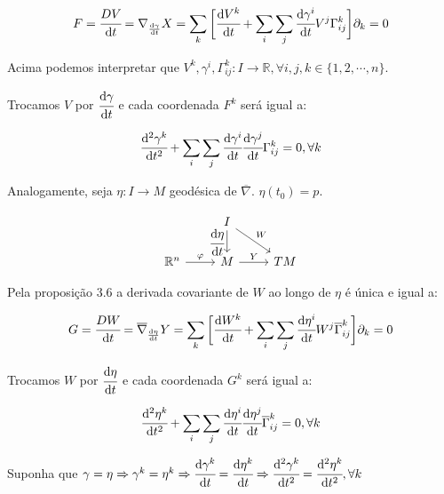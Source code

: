 \documentclass[10pt,a4paper]{article}
\begin{document}
		\begin{align*}
		  F = \cfrac{DV}{\mathrm{d} t} = \nabla_{\frac{\mathrm{d} \gamma}{\mathrm{d} t}} X = \sum_k \bigg[ \cfrac{\mathrm{d} V^k}{\mathrm{d} t} + \sum_i \sum_j \cfrac{\mathrm{d} \gamma^i}{\mathrm{d} t} V^j \Gamma_{ij}^k \bigg] \partial_k = 0
		\end{align*}

		Acima podemos interpretar que $V^k, \gamma^i, \Gamma_{ij}^k : I \rightarrow \mathbb{R}, \forall i,j,k \in \{ 1, 2, \cdots, n \}$.

		Trocamos $V$ por $\cfrac{\mathrm{d} \gamma}{\mathrm{d} t}$ e cada coordenada $F^k$ ser\'a igual a:

		\begin{align*}
		  \cfrac{\mathrm{d}^2 \gamma^k}{\mathrm{d} t^2} + \sum_i \sum_j \cfrac{\mathrm{d} \gamma^i}{\mathrm{d} t} \cfrac{\mathrm{d} \gamma^j}{\mathrm{d} t} \Gamma_{ij}^k = 0, \forall k
		\end{align*}

		Analogamente, seja $\eta : I \rightarrow M$ geod\'esica de $\overline{\nabla}$. $\eta(t_0) = p$.

		\[
		\begin{tikzcd}
		& I \arrow[swap]{d}{\cfrac{\mathrm{d} \eta}{\mathrm{d} t}} \arrow{rd}{W} &  \\
		\mathbb{R}^n \arrow{r}{\varphi} & M \arrow{r}{Y} & TM
		\end{tikzcd}
		\]

		Pela proposi\c{c}\~ao 3.6 a derivada covariante de $W$ ao longo de $\eta$  \'e \'unica e igual a:

		\begin{align*}
		  G = \cfrac{DW}{\mathrm{d} t} = \overline{\nabla}_{\frac{\mathrm{d} \eta}{\mathrm{d} t}} Y = \sum_k \bigg[ \cfrac{\mathrm{d} W^k}{\mathrm{d} t} + \sum_i \sum_j \cfrac{\mathrm{d} \eta^i}{\mathrm{d} t} W^j \overline{\Gamma}_{ij}^k \bigg] \partial_k = 0
		\end{align*}

		Trocamos $W$ por $\cfrac{\mathrm{d} \eta}{\mathrm{d} t}$ e cada coordenada $G^k$ ser\'a igual a:

		\begin{align*}
		  \cfrac{\mathrm{d}^2 \eta^k}{\mathrm{d} t^2} + \sum_i \sum_j \cfrac{\mathrm{d} \eta^i}{\mathrm{d} t} \cfrac{\mathrm{d} \eta^j}{\mathrm{d} t} \overline{\Gamma}_{ij}^k = 0, \forall k
		\end{align*}

		Suponha que $\gamma = \eta \Rightarrow \gamma^k = \eta^k \Rightarrow \cfrac{\mathrm{d} \gamma^k}{\mathrm{d} t} = \cfrac{\mathrm{d} \eta^k}{\mathrm{d} t} \Rightarrow \cfrac{\mathrm{d}^2 \gamma^k}{\mathrm{d} t^2} = \cfrac{\mathrm{d}^2 \eta^k}{\mathrm{d} t^2}, \forall k$
\end{document}
